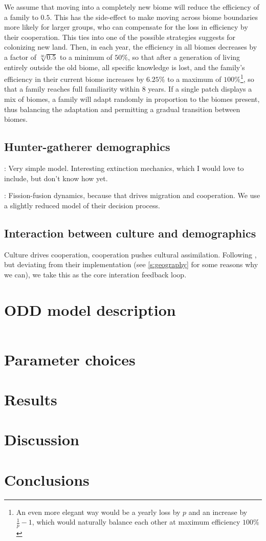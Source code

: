 \documentclass[a4paper,12pt]{scrartcl}
\begin{document}
We assume that moving into a completely new biome will reduce the efficiency of
a family to $0.5$. This has the side-effect to make moving across biome
boundaries more likely for larger groups, who can compensate for the loss in
efficiency by their cooperation. This ties into one of the possible strategies
\textcite{kelly2003colonization} suggests for colonizing new land. Then, in each
year, the efficiency in all biomes decreases by a factor of $\sqrt[30]{0.5}$ to
a minimum of $50\%$, so that after a generation of living entirely outside the
old biome, all specific knowledge is lost, and the family's efficiency in their
current biome increases by $6.25\%$ to a maximum of $100\%$\footnote{An even
  more elegant way would be a yearly loss by $p$ and an increase by $\frac{1}{p}
  -1$, which would naturally balance each other at maximum efficiency $100\%$}, so
that a family reaches full familiarity within 8 years. If a single patch
displays a mix of biomes, a family will adapt randomly in proportion to the
biomes present, thus balancing the adaptation and permitting a gradual
transition between biomes.

\subsection{Hunter-gatherer demographics}
\label{s:demographics}

\textcite{hamilton2018stochastic}: Very simple model. Interesting extinction
mechanics, which I would love to include, but don't know how yet.

\textcite{crema2014simulation}: Fission-fusion dynamics, because that drives
migration and cooperation. We use a slightly reduced model of their decision
process.

\subsection{Interaction between culture and demographics}
\label{s:interaction}

Culture drives cooperation, cooperation pushes cultural assimilation. Following
\parencite{barcelo2014social,barcelo2015simulating}, but deviating from their
implementation (see \cref{s:geography} for some reasons why we can), we take this
as the core interation feedback loop.

\section{ODD model description}
\label{s:odd}

\inputminted{rust}{supplement/dispersal_model_rust/src/main.rs}

\section{Parameter choices}
\label{s:parameters}
\section{Results}
\label{s:results}
\section{Discussion}
\label{s:discussion}
\section{Conclusions}
\label{s:conclusions}

\printbibliography
\end{document}
